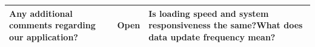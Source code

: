 \begin{table}[h!]
\begin{tabular}{|p{}|p{}|p{}|}
        \hline
        Any additional comments regarding our application?                                                                       & Open                   & Is loading speed and system responsiveness the same?What does data update frequency mean?                                                                                                                             \\
        \hline
    \end{tabular}
\end{table}

